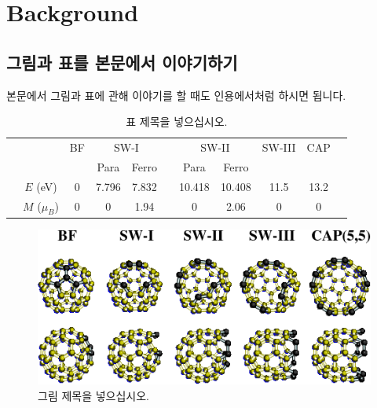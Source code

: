 \chapter{Background}
\section{그림과 표를 본문에서 이야기하기}

본문에서 그림과 표에 관해 이야기를 할 때도 인용에서처럼 하시면 됩니다.

\begin{table}[t]
\caption[캡션제목 넣으십시오]{표 제목을 넣으십시오.
}
\label{mag-tab1}
\begin{center}
\begin{tabular} {ccccccccccc}
\hline\hline
& & BF &\multicolumn{2}{c}{SW-I}&&\multicolumn{2}{c}{SW-II}&SW-III&CAP&\\
\cline{4-5} \cline{7-8}
&               &   &  Para & Ferro &&   Para &  Ferro &      &      &\\
\hline
& $E$ (eV)      & 0 & 7.796 & 7.832 && 10.418 & 10.408 & 11.5 & 13.2 &\\
& $M$ ($\mu_B$) & 0 &     0 &  1.94 &&      0 &   2.06 &    0 &    0 &\\
\hline\hline
\end{tabular}
\end{center}
\end{table}



\begin{figure}[t]
    \centerline{\includegraphics[width=12.5cm]{sample-fig1}}
    \caption[캡션제목 넣으십시오]{그림 제목을 넣으십시오.
    } \label{mag-fig1}
\end{figure}
